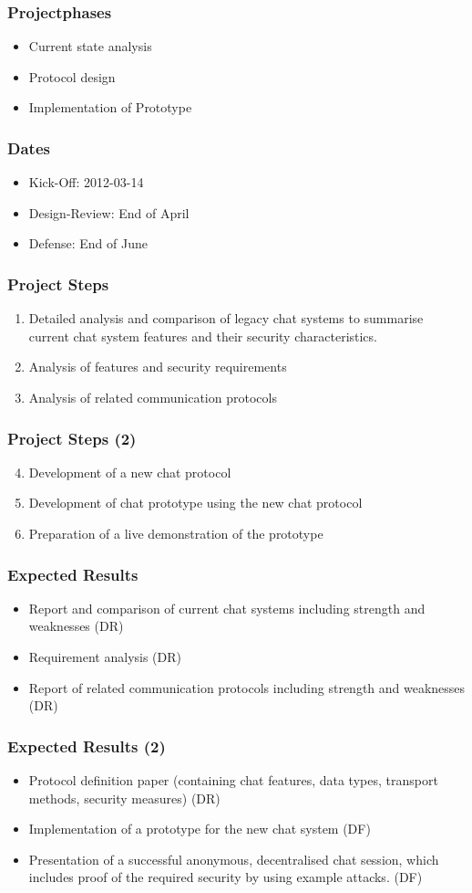 \documentclass{beamer}
\begin{document}
\frame
{
  \frametitle{Projectphases}
  \begin{itemize}
     \item Current state analysis
     \item Protocol design
     \item Implementation of Prototype
  \end{itemize}
}

\frame
{
  \frametitle{Dates}
  \begin{itemize}
     \item Kick-Off: 2012-03-14
     \item Design-Review: End of April
     \item Defense: End of June
  \end{itemize}
}

\frame
{
  \frametitle{Project Steps}
  \begin{enumerate}
     \item Detailed analysis and comparison of legacy chat systems
        to summarise current chat system features and their
        security characteristics.
    \item Analysis of features and security requirements
    \item Analysis of related communication protocols
  \end{enumerate}
}
\frame
{
  \frametitle{Project Steps (2)}
  \begin{enumerate}
    \setcounter{enumi}{3}
    \item Development of a new chat protocol
    \item Development of chat prototype using the new chat protocol
    \item Preparation of a live demonstration of the prototype
  \end{enumerate}
}

\frame
{
  \frametitle{Expected Results}
  \begin{itemize}
    \item Report and comparison of current chat systems including strength and weaknesses (DR)
    \item Requirement analysis (DR)
    \item Report of related communication protocols including strength and weaknesses (DR)
  \end{itemize}
}
\frame
{
  \frametitle{Expected Results (2)}
  \begin{itemize}
     \item Protocol definition paper (containing chat features,
        data types, transport methods, security measures) (DR)
    \item Implementation of a prototype for the new chat system (DF)
    \item Presentation of a successful anonymous, decentralised chat session, which
       includes proof of the required security by using example attacks. (DF)
  \end{itemize}
}
\end{document}
